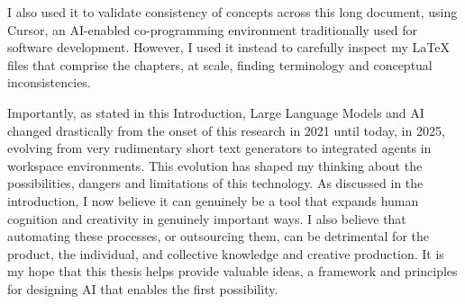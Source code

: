 I also used it to validate consistency of concepts across this long document, using Cursor, an AI-enabled co-programming environment traditionally used for software development. However, I used it instead to carefully inspect my LaTeX files that comprise the chapters, at scale, finding terminology and conceptual inconsistencies. 

Importantly, as stated in this Introduction, Large Language Models and AI changed drastically from the onset of this research in 2021 until today, in 2025, evolving from very rudimentary short text generators to integrated agents in workspace environments. This evolution has shaped my thinking about the possibilities, dangers and limitations of this technology. As discussed in the introduction, I now believe it can genuinely be a tool that expands human cognition and creativity in genuinely important ways. I also believe that automating these processes, or outsourcing them, can be detrimental for the product, the individual, and collective knowledge and creative production. It is my hope that this thesis helps provide valuable ideas, a framework and principles for designing AI that enables the first possibility.
